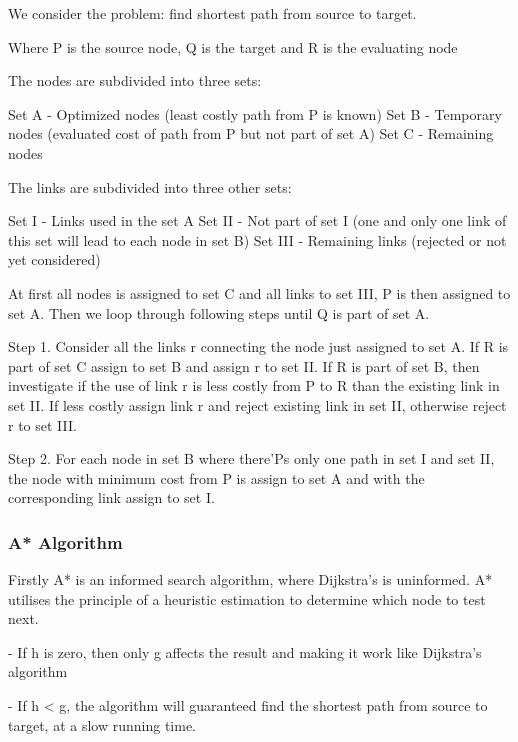   We consider the problem: find shortest path from source to target.

  Where P is the source node, Q is the target and R is the evaluating node

  The nodes are subdivided into three sets:

  Set A - Optimized nodes (least costly path from P is known)
  Set B - Temporary nodes (evaluated cost of path from P but not part of set A)
  Set C - Remaining nodes

  The links are subdivided into three other sets:

  Set I - Links used in the set A
  Set II - Not part of set I (one and only one link of this set will lead to each node in set B)
  Set III - Remaining links (rejected or not yet considered)

  At first all nodes is assigned to set C and all links to set III, P is then assigned to set A.
  Then we loop through following steps until Q is part of set A.

  Step 1. Consider all the links r connecting the node just assigned to set A. If R is part of set C assign to set B and assign r to set II.
  If R is part of set B, then investigate if the use of link r is less costly from P to R than the existing link in set II. If less costly assign link r and reject existing link in set II, otherwise reject r to set III.

  Step 2. For each node in set B where there'Ps only one path in set I and set II, the node with minimum cost from P is assign to set A and with the corresponding link assign to set I.



  \subsubsection{A* Algorithm}

  Firstly A* is an informed search algorithm, where Dijkstra's is uninformed. A* utilises the principle of a heuristic estimation to determine which node to test next.

  - If h is zero, then only g affects the result and making it work like Dijkstra's algorithm

  - If h < g, the algorithm will guaranteed find the shortest path from source to target, at a slow running time.

